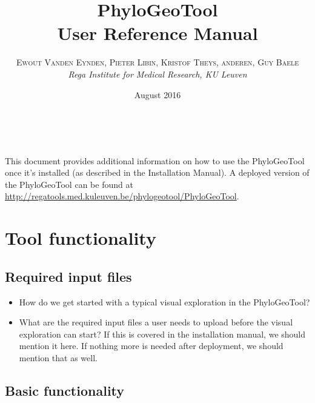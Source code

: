 \documentclass[a4paper, 11pt]{article} %
\title{\textbf{PhyloGeoTool}\\ %
User Reference Manual} %
\author{\textsc{Ewout Vanden Eynden, Pieter Libin, Kristof Theys, anderen, Guy Baele} %
\\{\textit{Rega Institute for Medical Research, KU Leuven}}} %
\date{August 2016} %
\makeatletter
\renewcommand{\maketitle}{ %
\begin{flushright} %
{\LARGE\@title} %

\vspace{50pt} %

{\large\@author} %
\\\@date %

\vspace{40pt} %
\end{flushright}
}
\makeatother
\begin{document}
\maketitle %

\vspace{30pt} %

\tableofcontents
\newpage

This document provides additional information on how to use the PhyloGeoTool once it's installed (as described in the Installation Manual).
A deployed version of the PhyloGeoTool can be found at \url{http://regatools.med.kuleuven.be/phylogeotool/PhyloGeoTool}.

\section{Tool functionality}

\subsection{Required input files}

\begin{itemize}
\item How do we get started with a typical visual exploration in the PhyloGeoTool? 
\item What are the required input files a user needs to upload before the visual exploration can start? If this is covered in the installation manual, we should mention it here. If nothing more is needed after deployment, we should mention that as well.
\end{itemize}


\subsection{Basic functionality}
\end{document}
